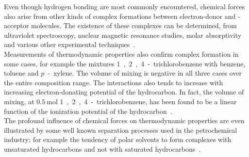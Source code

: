 Even though hydrogen bonding are most commonly encountered, chemical forces also arise from other kinds of complex formations between electron-donor and -acceptor molecules. The existence of these complexes can be determined, from ultraviolet spectroscopy, nuclear magnetic resonance studies, molar absorptivity and various other experimental techniques~\cite{MolecularThermodynamicsOfFluidPhaseEquilibria}.\\

 Measurements of thermodynamic properties also confirm complex formation in some cases, for example the mixtures 1~,~2~,~4~-~trichlorobenzene with benzene, toluene and $p$~-~xylene. The volume of mixing is negative in all three cases over the entire composition range. The interactions also tends to increase with increasing electron-donating potential of the hydrocarbon. In fact, the volume of mixing, at $0.5~\mathrm{mol}$ 1~,~2~,~4~-~trichlorobenzene, has been found to be a linear function of the ionization potential of the hydrocarbon~\cite{MolecularThermodynamicsOfFluidPhaseEquilibria}.\\
 
The profound influence of chemical forces on thermodynamic properties are even illustrated by some well known separation processes used in the petrochemical industry; for example the tendency of polar solvents to form complexes with unsaturated hydrocarbons and not with saturated hydrocarbons~\cite{MolecularThermodynamicsOfFluidPhaseEquilibria}.\\
 






 
 
